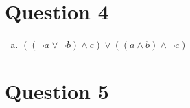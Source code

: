 \documentclass[12pt]{article}
\begin{document}
\section*{Question 4}
\begin{enumerate}[a.]
    \item

    $((\neg a \lor \neg b) \land c) \lor ((a \land b) \land \neg c)$
\end{enumerate}

\section*{Question 5}
\end{document}
